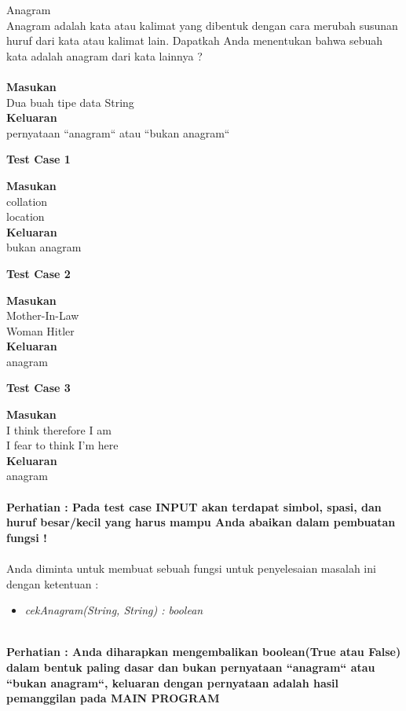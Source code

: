 \begin{permasalahan}{Anagram}\\
\label{prob:anagram}
	Anagram adalah kata atau kalimat yang dibentuk dengan cara merubah susunan huruf dari kata atau kalimat lain. Dapatkah Anda menentukan bahwa sebuah kata adalah anagram dari kata lainnya ? \\\\
	\textbf{Masukan}\\
	Dua buah tipe data String\\
	\textbf{Keluaran}\\
	pernyataan ``anagram`` atau ``bukan anagram``\\
	\begin{center}
	\textbf{Test Case 1}\\
	\end{center}
	\textbf{Masukan}\\
	collation\\
	location\\
	\textbf{Keluaran}\\
	bukan anagram
	
	\begin{center}
	\textbf{Test Case 2}\\
	\end{center}
	\textbf{Masukan}\\
	Mother-In-Law\\
	Woman Hitler\\
	\textbf{Keluaran}\\
	anagram

	\begin{center}
	\textbf{Test Case 3}\\
	\end{center}
	\textbf{Masukan}\\
	I think therefore I am\\
  I fear to think I'm here\\
	\textbf{Keluaran}\\
	anagram\\\\

		\textbf{Perhatian : Pada test case INPUT akan terdapat simbol, spasi, dan huruf besar/kecil yang harus mampu Anda abaikan dalam pembuatan fungsi !} \\\\
	
	Anda diminta untuk membuat sebuah fungsi untuk penyelesaian masalah ini dengan ketentuan : \\
	\begin{itemize}
		\item \textit{cekAnagram(String, String) : boolean}\\\\
	\end{itemize}
	
	
	\textbf{Perhatian : Anda diharapkan mengembalikan boolean(True atau False) dalam bentuk paling dasar dan bukan pernyataan ``anagram`` atau ``bukan anagram``, keluaran dengan pernyataan adalah hasil pemanggilan pada MAIN PROGRAM}
\end{permasalahan}


